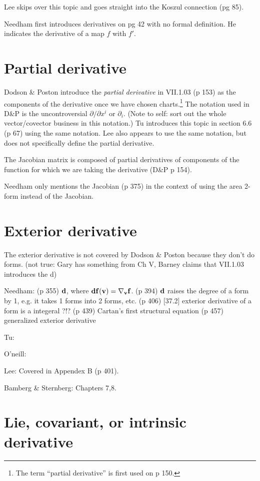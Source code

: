 \documentclass{article}
\begin{document}
Lee skips over this topic and goes straight into the Koszul connection (pg 85).

Needham first introduces derivatives on pg 42 with no formal definition.  He
indicates the derivative of a map $f$ with $f'$.

\section{Partial derivative}

Dodson \& Poston introduce the \emph{partial derivative} in VII.1.03 (p 153) as
the components of the derivative once we have chosen charts.\footnote{The term
  ``partial derivative'' is first used on p 150.}  The notation used in D\&P is
the uncontroversial $\partial/\partial x^i$  or $\partial_i$.  (Note to self:
sort out the whole vector/covector business in this notation.) Tu introduces
this topic in section 6.6 (p 67) using the same notation.  Lee also appears to
use the same notation, but does not specifically define the partial derivative.

The Jacobian matrix is composed of partial derivatives of components of the
function for which we are taking the derivative (D\&P p 154).

Needham only mentions the Jacobian (p 375) in the context of using the area
2-form instead of the Jacobian.

\section{Exterior derivative}

The exterior derivative is not covered by Dodson \& Poston because they don't do
forms.  (not true:  Gary has something from Ch V, Barney claims that VII.1.03
introduces the d)

Needham: (p 355) $\bf{d}$, where $\bf{d}f(\bf{v}) = \bf{\nabla_v}f$.
(p 394) $\bf{d}$ raises the degree of a form by 1, e.g. it takes 1 forms into 2
forms, etc.
(p 406) [37.2] exterior derivative of a form is a integeral ?!?
(p 439) Cartan's first structural equation
(p 457) generalized exterior derivative

Tu:


O'neill:


Lee: Covered in Appendex B (p 401).


Bamberg \& Sternberg: Chapters 7,8.



\section{Lie, covariant, or intrinsic derivative}
\end{document}
